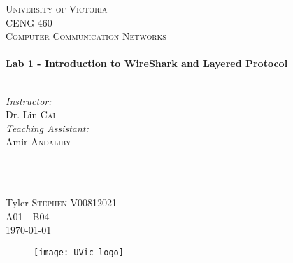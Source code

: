 \begin{titlepage}

\center
 
\textsc{\LARGE University of Victoria}\\[1cm] 	%
\textsc{\Large CENG 460}\\[0.5cm] 			%
\textsc{\large Computer Communication Networks}\\[0.5cm] 		%


\HRule \\[0.4cm]
{\huge \bfseries Lab 1 - Introduction to WireShark and Layered Protocol}\\[0.2cm] %
\HRule \\[1.5cm]
 
 
\begin{minipage}{0.7\textwidth}
\begin{flushleft} 

\large\emph{Instructor:} \\
Dr. Lin \textsc{Cai} \\
\vspace{12 pt}
\emph{Teaching Assistant:} \\
Amir \textsc{Andaliby}

\end{flushleft}
\end{minipage}
~
\begin{minipage}{0.1\textwidth}
\begin{flushright} \large

\vspace{12 pt}

\end{flushright}
\end{minipage}\\[2cm]


\Large Tyler \textsc{Stephen}
\large V00812021	\\
A01 - B04\\[1.5cm] 


{\large \today}\\ %

\begin{figure}[b]	 %
	\centering
	\texttt{[image: UVic\_logo]}
\end{figure}

\end{titlepage}
